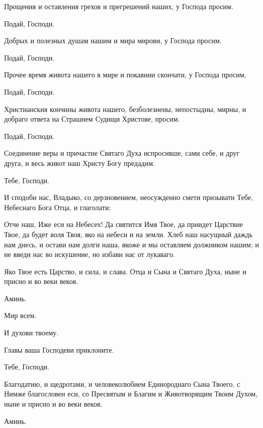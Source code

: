 \begin{mymulticols}
 Прощения и оставления грехов и прегрешений наших, у Господа просим. 

 Подай, Господи.

 Добрых и полезных душам нашим и мира мирови, у Господа просим. 

 Подай, Господи.

 Прочее время живота нашего в мире и покаянии скончати, у Господа просим. 

 Подай, Господи.

 Христианския кончины живота нашего, безболезнены, непостыдны, мирны, и добраго ответа на Страшнем Судищи Христове, просим. 

 Подай, Господи.

 Соединение веры и причастие Святаго Духа испросивше, сами себе, и друг друга, и весь живот наш Христу Богу предадим. 

 Тебе, Господи. 

 И сподоби нас, Владыко, со дерзновением, неосужденно смети призывати Тебе, Небеснаго Бога Отца, и глаголати: 


 Отче наш, Иже еси на Небесех! Да святится Имя Твое, да приидет Царствие Твое, да будет воля Твоя, яко на небеси и на земли. Хлеб наш насущный даждь нам днесь, и остави нам долги наша, якоже и мы оставляем должником нашим; и не введи нас во искушение, но избави нас от лукаваго. 

 Яко Твое есть Царство, и сила, и слава. Отца и Сына и Святаго Духа, ныне и присно и во веки веков. 

 Аминь. 

 Мир всем. 

 И духови твоему.

 Главы ваша Господеви приклоните.

 Тебе, Господи.

 Благодатию, и щедротами, и человеколюбием Единороднаго Сына Твоего, с Нимже благословен еси, со Пресвятым и Благим и Животворящим Твоим Духом, ныне и присно и во веки веков. 

 Аминь.



\end{mymulticols}
